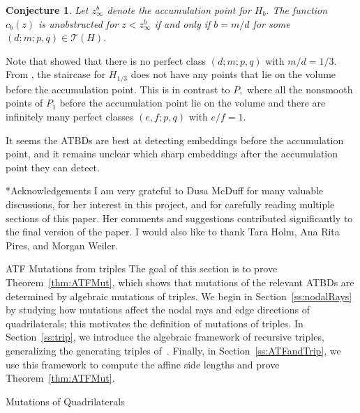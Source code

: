 \documentclass[11pt, reqno]{amsart}
\makeatletter
\def\section{\@startsection{section}{1}%
  \z@{.7\linespacing\@plus\linespacing}{.5\linespacing}%
  {\normalfont\Large\bfseries}}
\def\subsection{\@startsection{subsection}{2}%
  \z@{.5\linespacing\@plus.7\linespacing}{-.5em}%
  {\normalfont\large\bfseries}}
\newtheorem{conjecture}[thm]{Conjecture}
\theoremstyle{remark}
\numberwithin{equation}{subsection}
\numberwithin{figure}{section}
\theoremstyle{customremark}
\newcommand{\T}{\mathcal{T}}
\makeatother
\begin{document}
\begin{conjecture}
 Let $z_\infty^b$ denote the accumulation point for $H_b.$ The function
 $c_b(z)$ is unobstructed for $z<z_\infty^b$ if and only if $b=m/d$ for some $(d;m;p,q) \in \T(H).$  
\end{conjecture}

Note that \cite[Lemma 2.2.13]{MM} showed that there is no perfect class $(d;m;p,q)$ with $m/d=1/3$. From \cite{AADT}, the staircase for $H_{1/3}$ does not have any points that lie on the volume before the accumulation point. This is in contrast to $P,$ where all the nonsmooth points of $P_1$ before the accumulation point lie on the volume and there are infinitely many perfect classes $(e,f;p,q)$ with $e/f=1.$

It seems the ATBDs are best at detecting embeddings before the accumulation point, and it remains unclear which sharp embeddings after the accumulation point they can detect. 

\section*{Acknowledgements} I am very grateful to Dusa McDuff for many valuable discussions, for her
interest in this project, and for carefully reading multiple sections of this paper. Her comments and suggestions contributed significantly to the final version of the paper. I would also like to thank Tara Holm, Ana Rita Pires, and Morgan Weiler. 


 \section{ATF Mutations from triples}
 The goal of this section is to prove Theorem~\ref{thm:ATFMut}, which shows that mutations of the relevant ATBDs are determined by algebraic mutations of triples. We begin in Section~\ref{ss:nodalRays} by studying how mutations affect the nodal rays and edge directions of quadrilaterals; this motivates the definition of mutations of triples. In Section~\ref{ss:trip}, we introduce the algebraic framework of recursive triples, generalizing the generating triples of~\cite{MMW}. Finally, in Section~\ref{ss:ATFandTrip}, we use this framework to compute the affine side lengths and prove Theorem~\ref{thm:ATFMut}.

\subsection{Mutations of Quadrilaterals}\label{ss:nodalRays}
\end{document}
